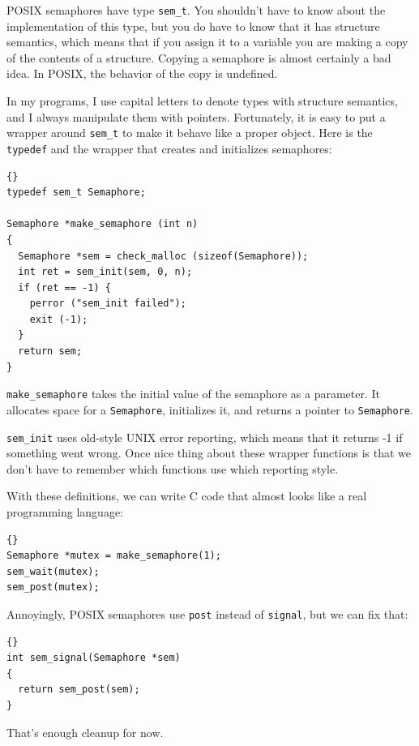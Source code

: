 \documentclass{book}
\begin{document}
POSIX semaphores have type {\tt sem\_t}.  You shouldn't have
to know about the implementation of this type, but you do
have to know that it has structure semantics, which means that
if you assign it to a variable you are making a copy of the
contents of a structure.  Copying a semaphore is almost certainly
a bad idea.  In POSIX, the behavior of the copy is undefined.

In my programs, I use capital letters to denote types with
structure semantics, and I always manipulate them with pointers.
Fortunately, it is easy to put a wrapper around {\tt sem\_t}
to make it behave like a proper object.  Here is the 
{\tt typedef} and the wrapper that creates and initializes
semaphores:

\begin{lstlisting}[title={}]{}
typedef sem_t Semaphore;

Semaphore *make_semaphore (int n)
{
  Semaphore *sem = check_malloc (sizeof(Semaphore));
  int ret = sem_init(sem, 0, n);
  if (ret == -1) {
    perror ("sem_init failed");
    exit (-1);    
  }
  return sem;
}
\end{lstlisting}

{\tt make\_semaphore} takes the initial value of the semaphore
as a parameter.  It allocates space for a {\tt Semaphore}, initializes
it, and returns a pointer to {\tt Semaphore}.

{\tt sem\_init} uses old-style UNIX error reporting, which means
that it returns -1 if something went wrong.  Once nice thing
about these wrapper functions is that we don't have to remember
which functions use which reporting style.

With these definitions, we can write C code that almost looks
like a real programming language:

\begin{lstlisting}[title={}]{}
Semaphore *mutex = make_semaphore(1);
sem_wait(mutex);
sem_post(mutex);
\end{lstlisting}

Annoyingly, POSIX semaphores use {\tt post} instead of
{\tt signal}, but we can fix that:

\begin{lstlisting}[title={}]{}
int sem_signal(Semaphore *sem)
{
  return sem_post(sem);
}
\end{lstlisting}

That's enough cleanup for now.
\end{document}
